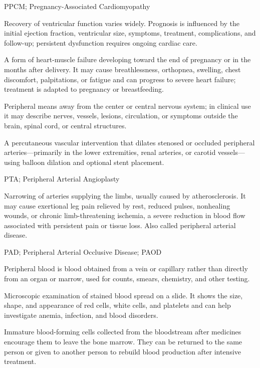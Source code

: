 \synonyms
PPCM; Pregnancy-Associated Cardiomyopathy

 Recovery of ventricular function varies widely. Prognosis is influenced by the initial ejection
fraction, ventricular size, symptoms, treatment, complications, and follow-up; persistent
dysfunction requires ongoing cardiac care.

 A form of heart-muscle failure developing toward the end of pregnancy or in the months after delivery. It may cause breathlessness, orthopnea, swelling, chest discomfort, palpitations, or fatigue and can progress to severe heart failure; treatment is adapted to pregnancy or breastfeeding.

 Peripheral means away from the center or central nervous system; in clinical use it may describe nerves, vessels, lesions, circulation, or symptoms outside the brain, spinal cord, or central structures.

 A percutaneous vascular intervention that dilates stenosed or occluded peripheral arteries—primarily in the lower extremities, renal arteries, or carotid vessels—using balloon dilation and optional stent placement.

\synonyms
PTA; Peripheral Arterial Angioplasty

 Narrowing of arteries supplying the limbs, usually caused by atherosclerosis. It may
cause exertional leg pain relieved by rest, reduced pulses, nonhealing wounds, or chronic limb-threatening ischemia, a severe reduction in blood flow associated with persistent pain or tissue loss. Also called peripheral arterial disease.

\synonyms
PAD; Peripheral Arterial Occlusive Disease; PAOD

 Peripheral blood is blood obtained from a vein or capillary rather than directly from an organ or marrow, used for counts, smears, chemistry, and other testing.

 Microscopic examination of stained blood spread on a slide. It shows the size, shape, and appearance of red cells, white cells, and platelets and can help investigate anemia, infection, and blood disorders.

 Immature blood-forming cells collected from the bloodstream after medicines encourage them to leave the bone marrow. They can be returned to the same person or given to another person to rebuild blood production after intensive treatment.


